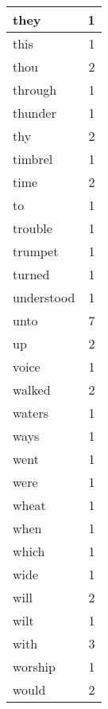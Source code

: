 \begin{center}
\begin{longtable}{l|r}
they & 1 \\ \hline
this & 1 \\ \hline
thou & 2 \\ \hline
through & 1 \\ \hline
thunder & 1 \\ \hline
thy & 2 \\ \hline
timbrel & 1 \\ \hline
time & 2 \\ \hline
to & 1 \\ \hline
trouble & 1 \\ \hline
trumpet & 1 \\ \hline
turned & 1 \\ \hline
understood & 1 \\ \hline
unto & 7 \\ \hline
up & 2 \\ \hline
voice & 1 \\ \hline
walked & 2 \\ \hline
waters & 1 \\ \hline
ways & 1 \\ \hline
went & 1 \\ \hline
were & 1 \\ \hline
wheat & 1 \\ \hline
when & 1 \\ \hline
which & 1 \\ \hline
wide & 1 \\ \hline
will & 2 \\ \hline
wilt & 1 \\ \hline
with & 3 \\ \hline
worship & 1 \\ \hline
would & 2 \\ \hline
\end{longtable}
\end{center}



\normalsize



